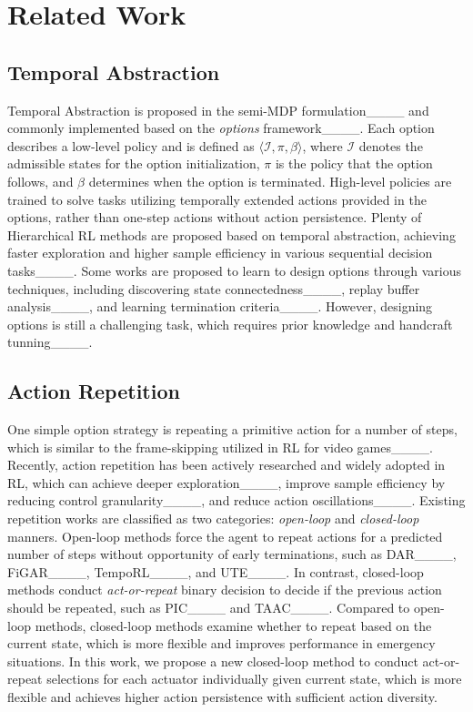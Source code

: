 \section{Related Work}
\subsection{Temporal Abstraction}
Temporal Abstraction is proposed in the semi-MDP formulation____ and commonly implemented based on the \emph{options} framework____.
Each option describes a low-level policy and is defined as $\langle\mathcal{I},\pi,\beta\rangle $, where $\mathcal{I}$ denotes the admissible states for the option initialization, $\pi$ is the policy that the option follows, and $\beta$ determines when the option is terminated.
High-level policies are trained to solve tasks utilizing temporally extended actions provided in the options, rather than one-step actions without action persistence.
Plenty of Hierarchical RL methods are proposed based on temporal abstraction, achieving faster exploration and higher sample efficiency in various sequential decision tasks____.
Some works are proposed to learn to design options through various techniques, including discovering state connectedness____, replay buffer analysis____, and learning termination criteria____.
However, designing options is still a challenging task, which requires prior knowledge and handcraft tunning____. 


\subsection{Action Repetition}
One simple option strategy is repeating a primitive action for a number of steps, which is similar to the frame-skipping utilized in RL for video games____.
Recently, action repetition has been actively researched and widely adopted in RL, which can achieve deeper exploration____, improve sample efficiency by reducing control granularity____, and reduce action oscillations____.
Existing repetition works are classified as two categories: \emph{open-loop} and \emph{closed-loop} manners.
Open-loop methods force the agent to repeat actions for a predicted number of steps without opportunity of early terminations, such as DAR____, FiGAR____, TempoRL____, and UTE____.
In contrast, closed-loop methods conduct \emph{act-or-repeat} binary decision to decide if the previous action should be repeated, such as PIC____ and TAAC____.
Compared to open-loop methods, closed-loop methods examine whether to repeat based on the current state, which is more flexible and improves performance in emergency situations.
In this work, we propose a new closed-loop method to conduct act-or-repeat selections for each actuator individually given current state, which is more flexible and achieves higher action persistence with sufficient action diversity.